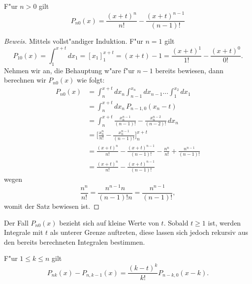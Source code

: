 \begin{satz}F"ur $n>0$ gilt
\begin{equation}
P_{n0}(x)=\frac{(x+t)^n}{n!}-\frac{(x+t)^{n-1}}{(n-1)!}
\end{equation}
\end{satz}
\begin{proof}[Beweis]
Mittels vollst"andiger Induktion. F"ur $n=1$ gilt
\[
P_{10}(x)=\int_1^{x+t}dx_1=[x_1]_1^{x+t}=(x+t)-1=\frac{(x+t)^1}{1!}-\frac{(x+t)^0}{0!}.
\]
Nehmen wir an, die Behauptung w"are f"ur $n-1$ bereits bewiesen, dann
berechnen wir $P_{n0}(x)$ wie folgt:
\begin{align*}
P_{n0}(x)
&=
\int_n^{x+t}dx_n\int_{n-1}^{x_n}dx_{n-1}\dots\int_1^{x_2}dx_1
\\
&=
\int_n^{x+t}dx_n\,P_{n-1,0}(x_n-t)
\\
&=
\int_n^{x+t}\frac{x_n^{n-1}}{(n-1)!}-\frac{x_n^{n-2}}{(n-2)!}\,dx_n
\\
&=
\biggl[\frac{x_n^n}{n!}-\frac{x_n^{n-1}}{(n-1)!}\biggr]_n^{x+t}
\\
&=
\frac{(x+t)^n}{n!}-\frac{(x+t)^{n-1}}{(n-1)!}
-\frac{n^n}{n!}+\frac{n^{n-1}}{(n-1)!}
\\
&=
\frac{(x+t)^n}{n!}-\frac{(x+t)^{n-1}}{(n-1)!}
\end{align*}
wegen
\[
\frac{n^n}{n!}=\frac{n^{n-1}n}{(n-1)! n}=\frac{n^{n-1}}{(n-1)!},
\]
womit der Satz bewiesen ist.
\end{proof}

Der Fall $P_{n0}(x)$ bezieht sich auf kleine Werte von $t$. Sobald 
$t\ge 1$ ist, werden Integrale mit $t$ als unterer Grenze auftreten,
diese lassen sich jedoch rekursiv aus den bereits berechneten
Integralen bestimmen.

\begin{satz}\label{kn-rekursion}
F"ur $1\le k\le n$ gilt
\begin{equation}
P_{nk}(x)-P_{n,k-1}(x)
=
\frac{(k-t)^k}{k!}P_{n-k,0}(x-k).
\end{equation}
\end{satz}

